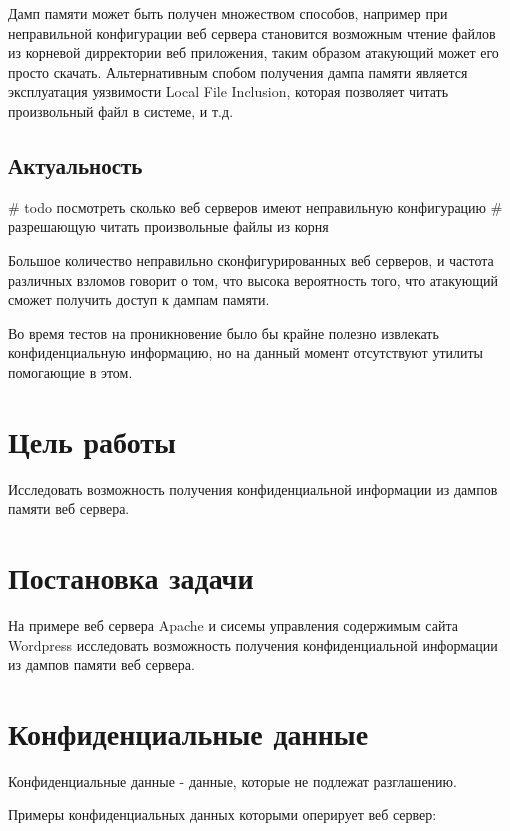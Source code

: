 \documentclass[20pt]{article}
\begin{document}
Дамп памяти может быть получен множеством способов, например при неправильной
конфигурации веб сервера становится возможным чтение файлов из корневой
дирректории веб приложения, таким образом атакующий может его просто скачать.
Альтернативным спобом получения дампа памяти является эксплуатация уязвимости
Local File Inclusion, которая позволяет читать произвольный файл в системе, и т.д.

\subsection{Актуальность}
\# todo посмотреть сколько веб серверов имеют неправильную конфигурацию
\# разрешающую читать произвольные файлы из корня

Большое количество неправильно сконфигурированных веб серверов, и частота различных
взломов говорит о том, что высока вероятность того, что атакующий сможет получить
доступ к дампам памяти.

Во время тестов на проникновение было бы крайне полезно извлекать конфиденциальную
информацию, но на данный момент отсутствуют утилиты помогающие в этом.

\newpage

\section{Цель работы}
Исследовать возможность получения конфиденциальной информации из дампов памяти веб сервера.

\newpage

\section{Постановка задачи}
На примере веб сервера Apache и сисемы управления содержимым сайта Wordpress
исследовать возможность получения конфиденциальной информации из дампов памяти
веб сервера.

\newpage

\section{Конфиденциальные данные}
Конфиденциальные данные - данные, которые не подлежат разглашению.

Примеры конфиденциальных данных которыми оперирует веб сервер:
\end{document}
